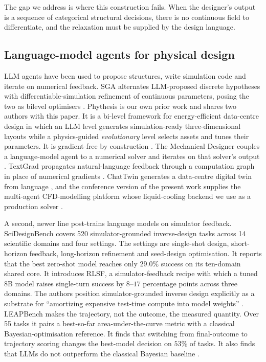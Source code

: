 The gap we address is where this construction fails.  When the designer's output
is a sequence of categorical structural decisions, there is no continuous field
to differentiate, and the relaxation must be supplied by the design language.

\subsection{Language-model agents for physical design}
\label{sec:rw-llm}
LLM agents have been used to propose structures, write simulation code and
iterate on numerical feedback.  SGA alternates LLM-proposed discrete hypotheses
with differentiable-simulation refinement of continuous parameters, posing the
two as bilevel optimisers \cite{ma2024sga}.  Phythesis is our own prior work and
shares two authors with this paper.  It is a bi-level framework for
energy-efficient data-centre design in which an LLM level generates
simulation-ready three-dimensional layouts while a physics-guided
\emph{evolutionary} level selects assets and tunes their parameters.  It is
gradient-free by construction \cite{phythesis2025}.  The Mechanical Designer
couples a language-model agent to a numerical solver and iterates on that
solver's output \cite{jadhav2026mechdesigner}.  TextGrad propagates
natural-language feedback through a computation graph in place of numerical
gradients \cite{yuksekgonul2024textgrad}.  ChatTwin generates a data-centre
digital twin from language \cite{li2023chattwin}, and the conference version of
the present work supplies the multi-agent CFD-modelling platform whose
liquid-cooling backend we use as a production solver \cite{li2026dctwin}.

A second, newer line post-trains language models on simulator feedback.
SciDesignBench covers 520 simulator-grounded inverse-design tasks across 14
scientific domains and four settings.  The settings are single-shot design,
short-horizon feedback, long-horizon refinement and seed-design optimisation.  It
reports that the best zero-shot model reaches only $29.0$\% success on its
ten-domain shared core.  It introduces RLSF, a simulator-feedback recipe with
which a tuned 8B model raises single-turn success by $8$--$17$ percentage points
across three domains.  The authors position simulator-grounded inverse design
explicitly as a substrate for ``amortizing expensive test-time compute into model
weights'' \cite{scidesignbench2026}.  LEAPBench makes the trajectory, not the
outcome, the measured quantity.  Over 55 tasks it pairs a best-so-far
area-under-the-curve metric with a classical Bayesian-optimisation reference.  It
finds that switching from final-outcome to trajectory scoring changes the
best-model decision on $53$\% of tasks.  It also finds that LLMs do not outperform
the classical Bayesian baseline \cite{zhang2026leap}.

